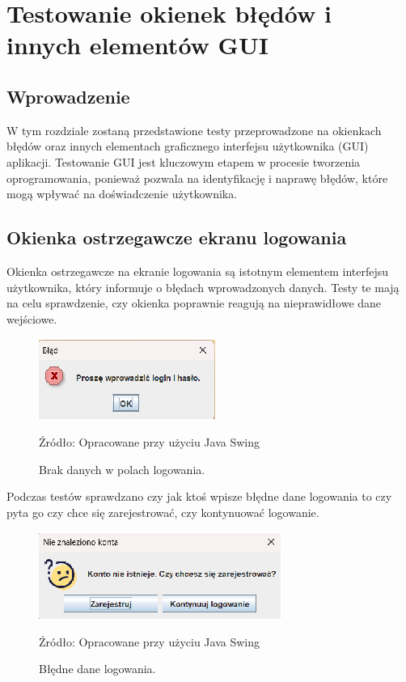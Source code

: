 \chapter{Testowanie okienek błędów i innych elementów GUI}
\label{chap:testowanie}

\section{Wprowadzenie}
W tym rozdziale zostaną przedstawione testy przeprowadzone na okienkach błędów oraz innych elementach graficznego interfejsu użytkownika (GUI) aplikacji. Testowanie GUI jest kluczowym etapem w procesie tworzenia oprogramowania, ponieważ pozwala na identyfikację i naprawę błędów, które mogą wpływać na doświadczenie użytkownika.

\section{Okienka ostrzegawcze ekranu logowania}
Okienka ostrzegawcze na ekranie logowania są istotnym elementem interfejsu użytkownika, który informuje o błędach wprowadzonych danych. Testy te mają na celu sprawdzenie, czy okienka poprawnie reagują na nieprawidłowe dane wejściowe.
\begin{figure}[H]
    \centering
    \includegraphics[width=0.8\linewidth]{figures/l1.eps}
    \caption{Brak danych w polach logowania.}
    \label{fig:login_win}
    \small{Źródło: Opracowane przy użyciu Java Swing}
\end{figure}
\clearpage

Podczas testów sprawdzano czy jak ktoś wpisze błędne dane logowania to czy pyta go czy chce się zarejestrować, czy kontynuować logowanie.

\begin{figure}[H]
    \centering
    \includegraphics[width=0.8\linewidth]{figures/l2.eps}
    \caption{Błędne dane logowania.}
    \label{fig:login_win}
    \small{Źródło: Opracowane przy użyciu Java Swing}
\end{figure}
\clearpage

